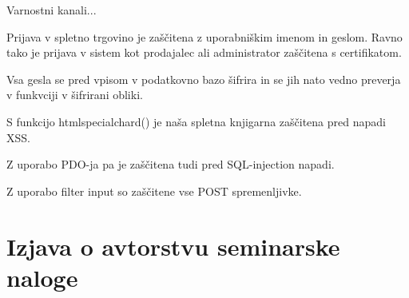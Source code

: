 \documentclass[a4paper,12pt]{report}
\begin{document}
Varnostni kanali... \newline

Prijava v spletno trgovino je zaščitena z uporabniškim imenom in geslom. Ravno tako je prijava v sistem kot prodajalec ali administrator zaščitena s certifikatom. \newline

Vsa gesla se pred vpisom v podatkovno bazo šifrira in se jih nato vedno preverja v funkvciji v šifrirani obliki.  \newline

S funkcijo htmlspecialchard() je naša spletna knjigarna zaščitena pred napadi XSS. \newline

Z uporabo PDO-ja pa je zaščitena tudi pred SQL-injection napadi. \newline

Z uporabo filter input so zaščitene vse POST spremenljivke.


\chapter{Izjava o avtorstvu seminarske naloge}
\end{document}
